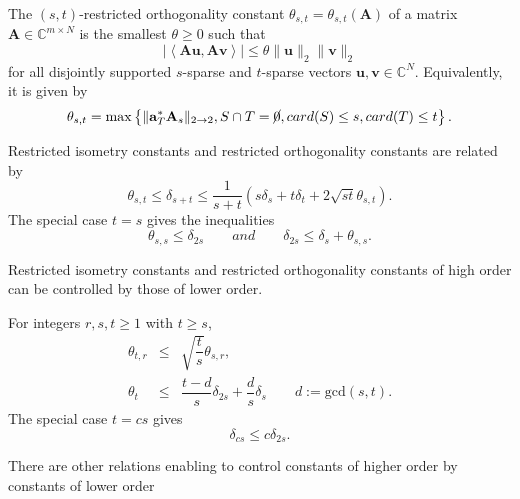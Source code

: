 \begin{definition}
    \label{def2.4}
    The $(s,t)$-restricted orthogonality constant $\theta_{s,t} = \theta_{s,t}(\mathbf{A})$ of a matrix $\mathbf{A} \in \mathbb{C}^{m \times N}$ is the smallest $\theta \geq 0$ such that
    \begin{equation}
        \label{eq2.4}
        \left|\left<\mathbf{Au}, \mathbf{Av}\right>\right| \leq \theta \|\mathbf{u}\|_2 \|\mathbf{v}\|_2
    \end{equation}
    for all disjointly supported $s$-sparse and $t$-sparse vectors $\mathbf{u,v} \in \mathbb{C}^N$. Equivalently, it is given by 
    \begin{equation}
        \label{eq2.5}
        \theta_{s,t} = \max\left\{\|\mathbf{a}_T^*\mathbf{A}_s\|_{2 \rightarrow 2}, S \cap T = \cancel{0}, card(S) \leq s, card(T) \leq t\right\}.
    \end{equation}
\end{definition}

\begin{proposition}
    \label{pr2.5}
    Restricted isometry constants and restricted orthogonality constants are related by
    \begin{equation*}
        \theta_{s,t} \leq \delta_{s+t} \leq \dfrac{1}{s+t}(s\delta_s + t\delta_t +2 \sqrt{st}\theta_{s,t}).
    \end{equation*}
    The special case $t=s$ gives the inequalities
    \begin{equation*}
        \theta_{s,s} \leq \delta_{2s} \qquad and \qquad \delta_{2s} \leq \delta_s + \theta_{s,s}.
    \end{equation*}
\end{proposition}

Restricted isometry constants and restricted orthogonality constants of high order can be controlled by those of lower order.
\begin{proposition}
    \label{pr1.6}
    For integers $r,s,t \geq 1$ with $t \geq s$,
    \begin{eqnarray*}
        \theta_{t,r} &\leq& \sqrt{\dfrac{t}{s}}\theta_{s,r}, \\
    \theta_t &\leq& \dfrac{t-d}{s}\delta_{2s} + \dfrac{d}{s} \delta_s \qquad d:= \text{gcd}(s,t).
    \end{eqnarray*}
    The special case $t= cs$ gives 
    \[
        \delta_{cs} \leq c \delta_{2s}.
    \]
\end{proposition}
\begin{remark}
    \label{rmk2.7}
    There are other relations enabling to control constants of higher order by constants of lower order
\end{remark}

